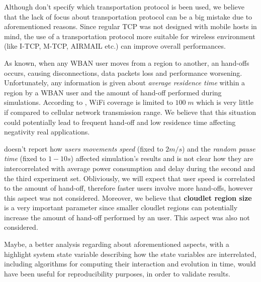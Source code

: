 \documentclass[sigchi]{acmart}
\begin{document}
Although \citet{MSAReport} don't specify which transportation protocol is been used, we believe that the lack of focus about transportation protocol can be a big mistake due to aforementioned reasons. Since regular TCP was not designed with mobile hosts in mind, the use of a transportation protocol more suitable for wireless environment (like I-TCP, M-TCP, AIRMAIL etc.) can improve overall performances.

As known, when any WBAN user moves from a region to another, an hand-offs occurs, causing disconnections, data packets loss and performance worsening. Unfortunately, any information is given about \textit{average residence time} within a region by a WBAN user and the amount of hand-off performed during simulations. According to \citet{MSAReport}, WiFi coverage is limited to $100\;m$ which is very little if compared to cellular network transmission range. We believe that this situation could potentially lead to frequent hand-off and low residence time affecting negativity real applications.

\citet{MSAReport} doesn't report how \textit{users movements speed} (fixed to $2 m/s$) and the \textit{random pause time} (fixed to $1-10 s$) affected simulation's results and is not clear how they are intercorrelated with average power consumption and delay during the second and the third experiment set. Obliviously, we will expect that user speed is correlated to the amount of hand-off, therefore faster users involve more hand-offs, however this aspect was not considered. Moreover, we believe that \textbf{cloudlet region size} is a very important parameter since smaller cloudlet regions can potentially increase the amount of hand-off performed by an user.\cite{tcp} This aspect was also not considered.

Maybe, a better analysis regarding about aforementioned aspects, with a highlight system state variable describing how the state variables are interrelated, including algorithms for computing their interaction and evolution in time, would have been useful for reproducibility purposes, in order to  validate \citet{MSAReport} results.






\appendix
\end{document}

